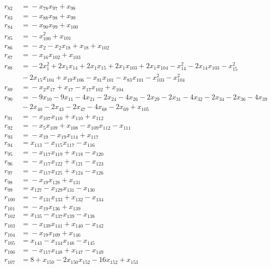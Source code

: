 \begin{align*}
r_{82} &={}-x_{78}x_{97} +x_{98} \\
r_{83} &={}-x_{88}x_{98} +x_{99} \\
r_{84} &={}-x_{90}x_{99} +x_{100} \\
r_{85} &={}-x_{100}^{2} +x_{101} \\
r_{86} &={}-x_{2} -x_{2}x_{18} +x_{18} +x_{102} \\
r_{87} &={}-x_{16}x_{102} +x_{103} \\
r_{88} &={}-2x_{1}^{2} +2x_{1}x_{14} +2x_{1}x_{15} +2x_{1}x_{103} +2x_{1}x_{104} -x_{14}^{2} -2x_{14}x_{103} -x_{15}^{2} \\
&{}-2x_{15}x_{104} +x_{19}x_{106} -x_{81}x_{101} -x_{83}x_{101} -x_{103}^{2} -x_{104}^{2} \\
r_{89} &={}-x_{2}x_{17} +x_{17} -x_{17}x_{102} +x_{104} \\
r_{90} &={}-9x_{10} -9x_{11} -4x_{21} -2x_{24} -4x_{26} -2x_{29} -2x_{31} -4x_{32} -2x_{34} -2x_{36} -4x_{39} \\
&{}-2x_{40} -2x_{43} -2x_{47} -4x_{68} -2x_{69} +x_{105} \\
r_{91} &={}-x_{107}x_{110} +x_{110} +x_{112} \\
r_{92} &={}-x_{5}x_{109} +x_{108} -x_{109}x_{112} -x_{111} \\
r_{93} &={}-x_{19} -x_{19}x_{114} +x_{117} \\
r_{94} &={}x_{113} -x_{115}x_{117} -x_{116} \\
r_{95} &={}-x_{117}x_{119} +x_{118} -x_{120} \\
r_{96} &={}-x_{117}x_{122} +x_{121} -x_{123} \\
r_{97} &={}-x_{117}x_{125} +x_{124} -x_{126} \\
r_{98} &={}-x_{19}x_{128} +x_{131} \\
r_{99} &={}x_{127} -x_{129}x_{131} -x_{130} \\
r_{100} &={}-x_{131}x_{133} +x_{132} -x_{134} \\
r_{101} &={}-x_{19}x_{136} +x_{139} \\
r_{102} &={}x_{135} -x_{137}x_{139} -x_{138} \\
r_{103} &={}-x_{139}x_{141} +x_{140} -x_{142} \\
r_{104} &={}-x_{19}x_{109} +x_{146} \\
r_{105} &={}x_{143} -x_{144}x_{146} -x_{145} \\
r_{106} &={}-x_{117}x_{148} +x_{147} -x_{149} \\
r_{107} &={}8 +x_{150} -2x_{150}x_{152} -16x_{152} +x_{153} \\

\end{align*}
